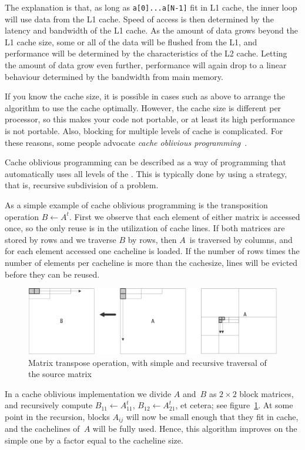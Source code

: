 The explanation is that,
as long as \texttt{a[0]...a[N-1]} fit in L1 cache, the inner loop will
use data from the L1 cache. Speed of access is then determined by the
latency and bandwidth of the L1 cache.
As the amount of data grows beyond the L1 cache size, some or all of
the data will be flushed from the L1, and performance will be determined by
the characteristics of the L2 cache. Letting the amount of data grow
even further, performance will again drop to a linear behaviour
determined by the bandwidth from main memory.


If you know the cache size, it is possible in cases such as above to
arrange the algorithm to use the cache optimally. However, the cache
size is different per processor, so this makes your code not portable,
or at least its high performance is not portable. Also, blocking for
multiple levels of cache is complicated. For these reasons, some
people advocate \emph{cache oblivious
  programming}~\cite{Frigo:oblivious}. 

Cache oblivious programming can be described as a way of programming
that automatically uses all levels of the
. This is typically done by using a
 strategy, that is, recursive
subdivision of a problem.

As a simple example of cache oblivious programming is the 
{transposition} operation $B\leftarrow A^t$. First we observe that each
element of either matrix is accessed once, so the only reuse is in the
utilization of cache lines. If both matrices are stored by
rows and we traverse $B$ by rows, then $A$~is traversed by columns,
and for each element accessed one cacheline is loaded. If the number
of rows times the number of elements per cacheline is more than the
cachesize, lines will be evicted before they can be reused.

\begin{figure}[ht]
  \includegraphics[scale=.1]{graphics/oblivious1}
  \caption{Matrix transpose operation, with simple and recursive
    traversal of the source matrix}
  \label{fig:oblivious-transpose}
\end{figure}
In a cache oblivious implementation we divide $A$ and~$B$ as
$2\times2$ block matrices, and recursively compute $B_{11}\leftarrow
A_{11}^t$, $B_{12}\leftarrow A_{21}^t$, et cetera; see
figure~\ref{fig:oblivious-transpose}. At some point in the recursion,
blocks $A_{ij}$ will now be small enough that they fit in cache, and
the cachelines of~$A$ will be fully used. Hence, this algorithm
improves on the simple one by a factor equal to the cacheline size.

